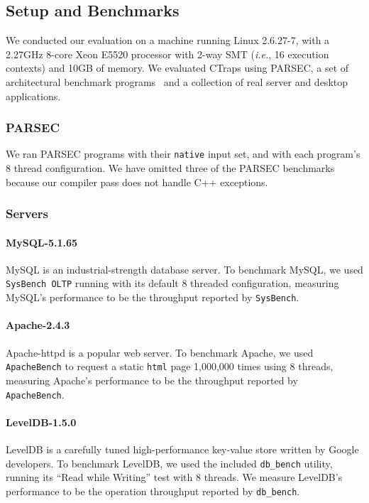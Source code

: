 \documentclass[preprint,9pt]{sigplanconf}
\newcommand{\ctraps}{CTraps\xspace}
\begin{document}
\subsection{Setup and Benchmarks}

We conducted our evaluation on a machine running Linux 2.6.27-7, with a 2.27GHz
8-core Xeon E5520 processor with 2-way SMT ({\em i.e.}, 16 execution contexts)
and 10GB of memory.  We evaluated \ctraps using PARSEC, a set of architectural
benchmark programs~\cite{parsec} and a collection of real server and desktop
applications.    

\subsubsection{PARSEC}

We ran PARSEC programs with their {\tt native} input set, and with each
program's 8 thread configuration. We have omitted three of the PARSEC
benchmarks because our compiler pass does not handle C++ exceptions.    

\subsubsection{Servers}


\paragraph{MySQL-5.1.65} MySQL is an industrial-strength database
server. To benchmark MySQL, we used {\tt SysBench OLTP} running with its
default 8 threaded configuration, measuring MySQL's performance to be the
throughput reported by {\tt SysBench}.  

\paragraph{Apache-2.4.3} 
Apache-httpd is a popular web server.  To benchmark Apache, we used {\tt
ApacheBench} to request a static {\tt html} page 1,000,000 times using 8 threads,
measuring Apache's performance to be the throughput reported by {\tt
ApacheBench}.  

\paragraph{LevelDB-1.5.0}
LevelDB is a carefully tuned high-performance key-value store written by Google
developers. To benchmark LevelDB, we used the included {\tt db\_bench} utility,
running its ``Read while Writing'' test with 8 threads.  We measure LevelDB's
performance to be the operation throughput reported by {\tt db\_bench}.
\end{document}
